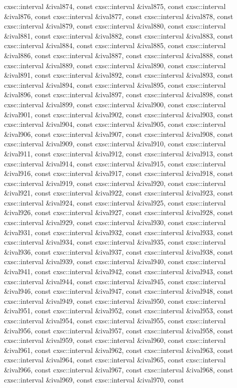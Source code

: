 \begin{DoxyCompactItemize}
cxsc\-::interval \&ival874, const cxsc\-::interval \&ival875, const cxsc\-::interval \&ival876, const cxsc\-::interval \&ival877, const cxsc\-::interval \&ival878, const cxsc\-::interval \&ival879, const cxsc\-::interval \&ival880, const cxsc\-::interval \&ival881, const cxsc\-::interval \&ival882, const cxsc\-::interval \&ival883, const cxsc\-::interval \&ival884, const cxsc\-::interval \&ival885, const cxsc\-::interval \&ival886, const cxsc\-::interval \&ival887, const cxsc\-::interval \&ival888, const cxsc\-::interval \&ival889, const cxsc\-::interval \&ival890, const cxsc\-::interval \&ival891, const cxsc\-::interval \&ival892, const cxsc\-::interval \&ival893, const cxsc\-::interval \&ival894, const cxsc\-::interval \&ival895, const cxsc\-::interval \&ival896, const cxsc\-::interval \&ival897, const cxsc\-::interval \&ival898, const cxsc\-::interval \&ival899, const cxsc\-::interval \&ival900, const cxsc\-::interval \&ival901, const cxsc\-::interval \&ival902, const cxsc\-::interval \&ival903, const cxsc\-::interval \&ival904, const cxsc\-::interval \&ival905, const cxsc\-::interval \&ival906, const cxsc\-::interval \&ival907, const cxsc\-::interval \&ival908, const cxsc\-::interval \&ival909, const cxsc\-::interval \&ival910, const cxsc\-::interval \&ival911, const cxsc\-::interval \&ival912, const cxsc\-::interval \&ival913, const cxsc\-::interval \&ival914, const cxsc\-::interval \&ival915, const cxsc\-::interval \&ival916, const cxsc\-::interval \&ival917, const cxsc\-::interval \&ival918, const cxsc\-::interval \&ival919, const cxsc\-::interval \&ival920, const cxsc\-::interval \&ival921, const cxsc\-::interval \&ival922, const cxsc\-::interval \&ival923, const cxsc\-::interval \&ival924, const cxsc\-::interval \&ival925, const cxsc\-::interval \&ival926, const cxsc\-::interval \&ival927, const cxsc\-::interval \&ival928, const cxsc\-::interval \&ival929, const cxsc\-::interval \&ival930, const cxsc\-::interval \&ival931, const cxsc\-::interval \&ival932, const cxsc\-::interval \&ival933, const cxsc\-::interval \&ival934, const cxsc\-::interval \&ival935, const cxsc\-::interval \&ival936, const cxsc\-::interval \&ival937, const cxsc\-::interval \&ival938, const cxsc\-::interval \&ival939, const cxsc\-::interval \&ival940, const cxsc\-::interval \&ival941, const cxsc\-::interval \&ival942, const cxsc\-::interval \&ival943, const cxsc\-::interval \&ival944, const cxsc\-::interval \&ival945, const cxsc\-::interval \&ival946, const cxsc\-::interval \&ival947, const cxsc\-::interval \&ival948, const cxsc\-::interval \&ival949, const cxsc\-::interval \&ival950, const cxsc\-::interval \&ival951, const cxsc\-::interval \&ival952, const cxsc\-::interval \&ival953, const cxsc\-::interval \&ival954, const cxsc\-::interval \&ival955, const cxsc\-::interval \&ival956, const cxsc\-::interval \&ival957, const cxsc\-::interval \&ival958, const cxsc\-::interval \&ival959, const cxsc\-::interval \&ival960, const cxsc\-::interval \&ival961, const cxsc\-::interval \&ival962, const cxsc\-::interval \&ival963, const cxsc\-::interval \&ival964, const cxsc\-::interval \&ival965, const cxsc\-::interval \&ival966, const cxsc\-::interval \&ival967, const cxsc\-::interval \&ival968, const cxsc\-::interval \&ival969, const cxsc\-::interval \&ival970, const 
\end{DoxyCompactItemize}
